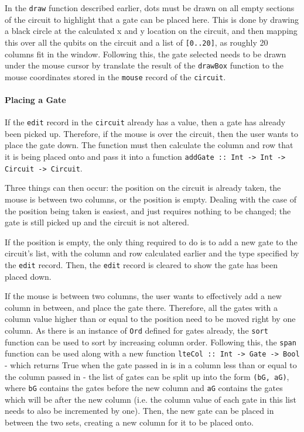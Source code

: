 \documentclass[a4paper,10pt, titlepage, twoside]{article}
\begin{document}
In the \texttt{draw} function described earlier, dots must be drawn on all empty sections of the circuit to highlight that a gate can be placed here. This is done by drawing a black circle at the calculated x and y location on the circuit, and then mapping this over all the qubits on the circuit and a list of \texttt{[0..20]}, as roughly 20 columns fit in the window. Following this, the gate selected needs to be drawn under the mouse cursor by translate the result of the \texttt{drawBox} function to the mouse coordinates stored in the \texttt{mouse} record of the \texttt{circuit}.

\paragraph{Placing a Gate}
If the \texttt{edit} record in the \texttt{circuit} already has a value, then a gate has already been picked up. Therefore, if the mouse is over the circuit, then the user wants to place the gate down. The function must then calculate the column and row that it is being placed onto and pass it into a function \texttt{addGate :: Int -> Int -> Circuit -> Circuit}.\par
Three things can then occur: the position on the circuit is already taken, the mouse is between two columns, or the position is empty. Dealing with the case of the position being taken is easiest, and just requires nothing to be changed; the gate is still picked up and the circuit is not altered. \par
If the position is empty, the only thing required to do is to add a new gate to the circuit's list, with the column and row calculated earlier and the type specified by the \texttt{edit} record. Then, the \texttt{edit} record is cleared to show the gate has been placed down.\par
If the mouse is between two columns, the user wants to effectively add a new column in between, and place the gate there. Therefore, all the gates with a column value higher than or equal to the position need to be moved right by one column. As there is an instance of \texttt{Ord} defined for gates already, the \texttt{sort} function can be used to sort by increasing column order. Following this, the \texttt{span} function can be used along with a new function \texttt{lteCol :: Int -> Gate -> Bool} - which returns True when the gate passed in is in a column less than or equal to the column passed in - the list of gates can be split up into the form \texttt{(bG, aG)}, where \texttt{bG} contains the gates before the new column and \texttt{aG} contains the gates which will be after the new column (i.e. the column value of each gate in this list needs to also be incremented by one). Then, the new gate can be placed in between the two sets, creating a new column for it to be placed onto. \par
\end{document}
